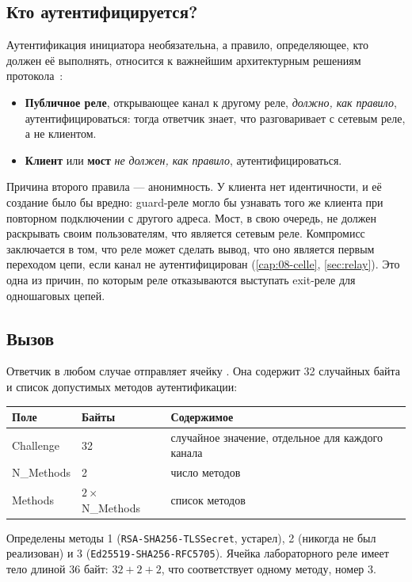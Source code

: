\subsection{Кто аутентифицируется?}

Аутентификация инициатора необязательна, а правило, определяющее, кто должен её выполнять, относится к важнейшим архитектурным решениям протокола~:
\begin{itemize}
  \item \textbf{Публичное реле}, открывающее канал к другому реле, \emph{должно, как правило}, аутентифицироваться: тогда ответчик знает, что разговаривает с сетевым реле, а не клиентом.
  \item \textbf{Клиент} или \textbf{мост} \emph{не должен, как правило}, аутентифицироваться.
\end{itemize}
Причина второго правила --- анонимность. У клиента нет идентичности, и её создание было бы вредно: guard-реле могло бы узнавать того же клиента при повторном подключении с другого адреса. Мост, в свою очередь, не должен раскрывать своим пользователям, что является сетевым реле. Компромисс заключается в том, что реле может сделать вывод, что оно является первым переходом цепи, если канал не аутентифицирован (\cref{cap:08-celle}, \cref{sec:relay}). Это одна из причин, по которым реле отказываются выступать exit-реле для одношаговых цепей.

\subsection{Вызов}

Ответчик в любом случае отправляет ячейку . Она содержит 32 случайных байта и список допустимых методов аутентификации:

\begin{center}
\begin{tabular}{lll}
\toprule
Поле & Байты & Содержимое \\
\midrule
Challenge & 32 & случайное значение, отдельное для каждого канала \\
N\_Methods & 2 & число методов \\
Methods & $2 \times$ N\_Methods & список методов \\
\bottomrule
\end{tabular}
\end{center}

Определены методы 1 (\texttt{RSA-SHA256-TLSSecret}, устарел), 2 (никогда не был реализован) и 3 (\texttt{Ed25519-SHA256-RFC5705}). Ячейка лабораторного реле имеет тело длиной 36 байт: $32 + 2 + 2$, что соответствует одному методу, номер 3.

